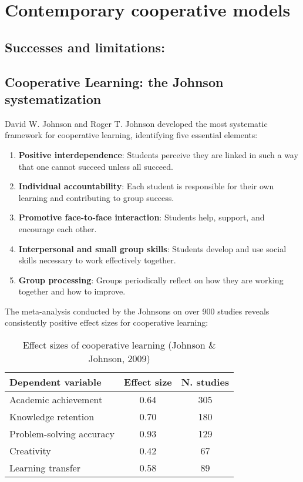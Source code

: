 \section{Contemporary cooperative models}
\subsection*{Successes and limitations:}
\subsection{Cooperative Learning: the Johnson systematization}

David W. Johnson and Roger T. Johnson \cite{Johnson1999} developed the most systematic framework for cooperative learning, identifying five essential elements:

\begin{enumerate}
	\item \textbf{Positive interdependence}: Students perceive they are linked in such a way that one cannot succeed unless all succeed.
	\item \textbf{Individual accountability}: Each student is responsible for their own learning and contributing to group success.  
	\item \textbf{Promotive face-to-face interaction}: Students help, support, and encourage each other.
	\item \textbf{Interpersonal and small group skills}: Students develop and use social skills necessary to work effectively together.
	\item \textbf{Group processing}: Groups periodically reflect on how they are working together and how to improve.
\end{enumerate}

The meta-analysis conducted by the Johnsons on over 900 studies reveals consistently positive effect sizes for cooperative learning:

\begin{table}[h]
	\centering
	\caption{Effect sizes of cooperative learning (Johnson \& Johnson, 2009)}
	\label{tab:cooperative-effect-sizes}
	\begin{tabular}{lcc}
		\toprule
		\textbf{Dependent variable} & \textbf{Effect size} & \textbf{N. studies} \\
		\midrule
		Academic achievement & 0.64 & 305 \\
		Knowledge retention & 0.70 & 180 \\
		Problem-solving accuracy & 0.93 & 129 \\
		Creativity & 0.42 & 67 \\
		Learning transfer & 0.58 & 89 \\
		\bottomrule
	\end{tabular}
\end{table}

